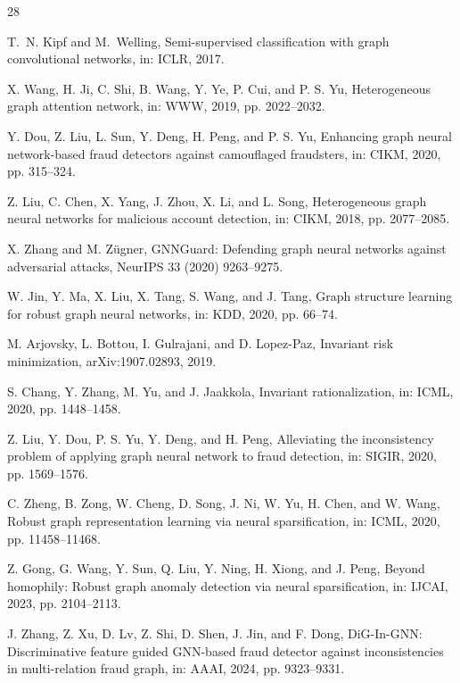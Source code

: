 \documentclass[11pt]{article}
\begin{document}
\begin{thebibliography}{28}

T.~N. Kipf and M.~Welling, Semi-supervised classification with graph convolutional networks, in: ICLR, 2017.

X. Wang, H. Ji, C. Shi, B. Wang, Y. Ye, P. Cui, and P. S. Yu, Heterogeneous graph attention network, in: WWW, 2019, pp. 2022--2032.

Y. Dou, Z. Liu, L. Sun, Y. Deng, H. Peng, and P. S. Yu, Enhancing graph neural network-based fraud detectors against camouflaged fraudsters, in: CIKM, 2020, pp. 315--324.

Z. Liu, C. Chen, X. Yang, J. Zhou, X. Li, and L. Song, Heterogeneous graph neural networks for malicious account detection, in: CIKM, 2018, pp. 2077--2085.

X. Zhang and M. Zügner, GNNGuard: Defending graph neural networks against adversarial attacks, NeurIPS 33 (2020) 9263--9275.

W. Jin, Y. Ma, X. Liu, X. Tang, S. Wang, and J. Tang, Graph structure learning for robust graph neural networks, in: KDD, 2020, pp. 66--74.

M. Arjovsky, L. Bottou, I. Gulrajani, and D. Lopez-Paz, Invariant risk minimization, arXiv:1907.02893, 2019.

S. Chang, Y. Zhang, M. Yu, and J. Jaakkola, Invariant rationalization, in: ICML, 2020, pp. 1448--1458.

Z. Liu, Y. Dou, P. S. Yu, Y. Deng, and H. Peng, Alleviating the inconsistency problem of applying graph neural network to fraud detection, in: SIGIR, 2020, pp. 1569--1576.

C. Zheng, B. Zong, W. Cheng, D. Song, J. Ni, W. Yu, H. Chen, and W. Wang, Robust graph representation learning via neural sparsification, in: ICML, 2020, pp. 11458--11468.

Z. Gong, G. Wang, Y. Sun, Q. Liu, Y. Ning, H. Xiong, and J. Peng, Beyond homophily: Robust graph anomaly detection via neural sparsification, in: IJCAI, 2023, pp. 2104--2113.

J. Zhang, Z. Xu, D. Lv, Z. Shi, D. Shen, J. Jin, and F. Dong, DiG-In-GNN: Discriminative feature guided GNN-based fraud detector against inconsistencies in multi-relation fraud graph, in: AAAI, 2024, pp. 9323--9331.


\end{thebibliography}
\end{document}
